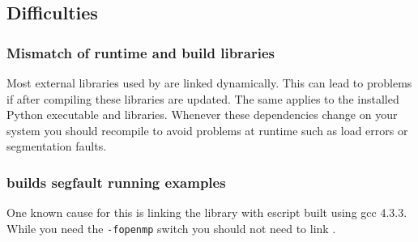 \subsection{Difficulties}\label{sec:diff}

\subsubsection{Mismatch of runtime and build libraries}
Most external libraries used by \esfinley are linked dynamically.
This can lead to problems if after compiling \esfinley these libraries are
updated.
The same applies to the installed Python executable and libraries.
Whenever these dependencies change on your system you should recompile
\esfinley to avoid problems at runtime such as load errors or segmentation
faults.

\subsubsection{\openmp builds segfault running examples}
One known cause for this is linking the  library with escript built using gcc 4.3.3.
While you need the \texttt{-fopenmp} switch you should not need to link .


